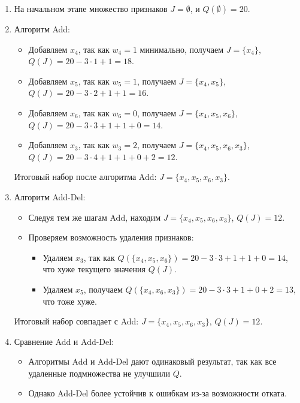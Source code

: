 \begin{enumerate}
    \item На начальном этапе множество признаков $J = \emptyset$, и $Q(\emptyset) = 20$.
    \item Алгоритм Add:
    \begin{itemize}
        \item Добавляем $x_4$, так как $w_4 = 1$ минимально, получаем $J = \{x_4\}$, $Q(J) = 20 - 3 \cdot 1 + 1 = 18$.
        \item Добавляем $x_5$, так как $w_5 = 1$, получаем $J = \{x_4, x_5\}$, $Q(J) = 20 - 3 \cdot 2 + 1 + 1 = 16$.
        \item Добавляем $x_6$, так как $w_6 = 0$, получаем $J = \{x_4, x_5, x_6\}$, $Q(J) = 20 - 3 \cdot 3 + 1 + 1 + 0 = 14$.
        \item Добавляем $x_3$, так как $w_3 = 2$, получаем $J = \{x_4, x_5, x_6, x_3\}$, $Q(J) = 20 - 3 \cdot 4 + 1 + 1 + 0 + 2 = 12$.
    \end{itemize}
    Итоговый набор после алгоритма Add: $J = \{x_4, x_5, x_6, x_3\}$.

    \item Алгоритм Add-Del:
    \begin{itemize}
        \item Следуя тем же шагам Add, находим $J = \{x_4, x_5, x_6, x_3\}$, $Q(J) = 12$.
        \item Проверяем возможность удаления признаков:
        \begin{itemize}
            \item Удаляем $x_3$, так как $Q(\{x_4, x_5, x_6\}) = 20 - 3 \cdot 3 + 1 + 1 + 0 = 14$, что хуже текущего значения $Q(J)$.
            \item Удаляем $x_5$, получаем $Q(\{x_4, x_6, x_3\}) = 20 - 3 \cdot 3 + 1 + 0 + 2 = 13$, что тоже хуже.
        \end{itemize}
    \end{itemize}
    Итоговый набор совпадает с Add: $J = \{x_4, x_5, x_6, x_3\}$, $Q(J) = 12$.
    
    \item Сравнение Add и Add-Del:
    \begin{itemize}
        \item Алгоритмы Add и Add-Del дают одинаковый результат, так как все удаленные подмножества не улучшили $Q$.
        \item Однако Add-Del более устойчив к ошибкам из-за возможности отката.
    \end{itemize}
\end{enumerate}